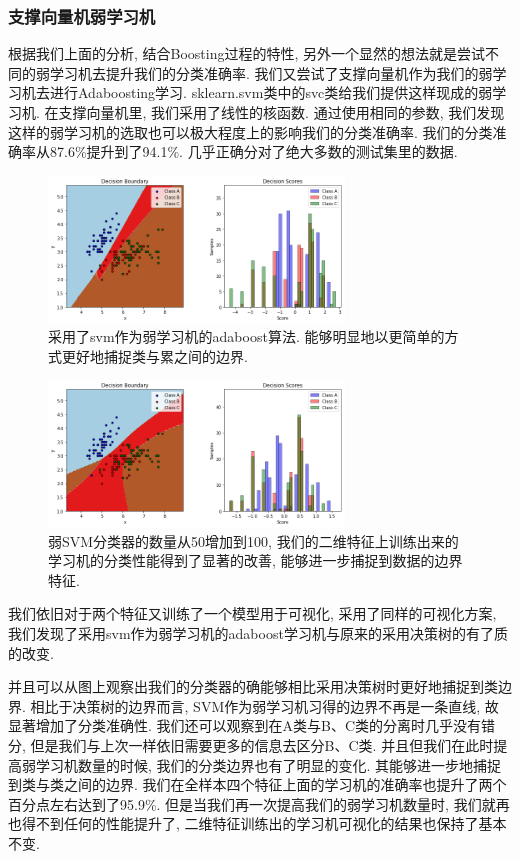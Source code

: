 \documentclass[lang=cn,11pt]{elegantpaper}
\begin{document}
\subsubsection{支撑向量机弱学习机}




根据我们上面的分析, 结合Boosting过程的特性, 另外一个显然的想法就是尝试不同的弱学习机去提升我们的分类准确率. 我们又尝试了支撑向量机作为我们的弱学习机去进行Adaboosting学习. sklearn.svm类中的svc类给我们提供这样现成的弱学习机. 在支撑向量机里, 我们采用了线性的核函数. 通过使用相同的参数, 我们发现这样的弱学习机的选取也可以极大程度上的影响我们的分类准确率. 我们的分类准确率从87.6\%提升到了94.1\%. 几乎正确分对了绝大多数的测试集里的数据.
\begin{figure}[htbp]	
  \centering
    \includegraphics[width=0.7\textwidth]{svm50}
    \caption{采用了svm作为弱学习机的adaboost算法. 能够明显地以更简单的方式更好地捕捉类与累之间的边界.}
  \end{figure}
\begin{figure}[htbp]
  \centering
  \includegraphics[width=0.7\textwidth]{svm100}
  \caption{弱SVM分类器的数量从50增加到100, 我们的二维特征上训练出来的学习机的分类性能得到了显著的改善, 能够进一步捕捉到数据的边界特征.}
\end{figure}

我们依旧对于两个特征又训练了一个模型用于可视化, 采用了同样的可视化方案, 我们发现了采用svm作为弱学习机的adaboost学习机与原来的采用决策树的有了质的改变.




并且可以从图上观察出我们的分类器的确能够相比采用决策树时更好地捕捉到类边界. 相比于决策树的边界而言, SVM作为弱学习机习得的边界不再是一条直线, 故显著增加了分类准确性. 我们还可以观察到在A类与B、C类的分离时几乎没有错分, 但是我们与上次一样依旧需要更多的信息去区分B、C类. 并且但我们在此时提高弱学习机数量的时候, 我们的分类边界也有了明显的变化. 其能够进一步地捕捉到类与类之间的边界. 我们在全样本四个特征上面的学习机的准确率也提升了两个百分点左右达到了95.9\%. 但是当我们再一次提高我们的弱学习机数量时, 我们就再也得不到任何的性能提升了, 二维特征训练出的学习机可视化的结果也保持了基本不变.





\newpage
\nocite{*}



\end{document}
